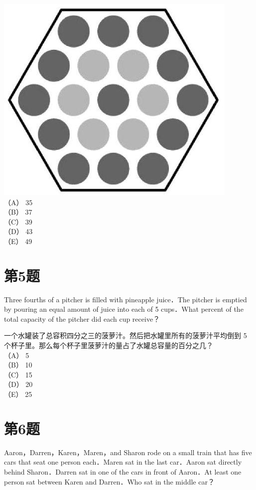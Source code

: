 \documentclass[10pt]{article}
\begin{document}
\includegraphics[max width=\textwidth, center]{2025_09_05_48544237b06df716137eg-02(1)}\\
（A） 35\\
（B） 37\\
（C） 39\\
（D） 43\\
（E） 49

\section*{第5题}
Three fourths of a pitcher is filled with pineapple juice．The pitcher is emptied by pouring an equal amount of juice into each of 5 cups．What percent of the total capacity of the pitcher did each cup receive？

一个水罐装了总容积四分之三的菠萝汁。然后把水罐里所有的菠萝汁平均倒到 5 个杯子里。那么每个杯子里菠萝汁的量占了水罐总容量的百分之几？\\
（A） 5\\
（B） 10\\
（C） 15\\
（D） 20\\
（E） 25

\section*{第6题}
Aaron，Darren，Karen，Maren，and Sharon rode on a small train that has five cars that seat one person each．Maren sat in the last car．Aaron sat directly behind Sharon．Darren sat in one of the cars in front of Aaron．At least one person sat between Karen and Darren．Who sat in the middle car？
\end{document}
